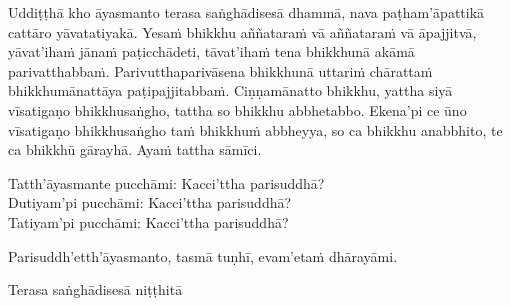 \medskip

\begin{center}
	Uddiṭṭhā kho āyasmanto terasa saṅghādisesā dhammā, nava paṭham'āpattikā cattāro yāvatatiyakā. Yesaṁ bhikkhu aññataraṁ vā aññataraṁ vā āpajjitvā, yāvat'ihaṁ jānaṁ paṭicchādeti, tāvat'ihaṁ tena bhikkhunā akāmā parivatthabbaṁ. Parivutthaparivāsena bhikkhunā uttariṁ chārattaṁ bhikkhumānattāya paṭipajjitabbaṁ. Ciṇṇamānatto bhikkhu, yattha siyā vīsatigaṇo bhikkhusaṅgho, tattha so bhikkhu abbhetabbo. Ekena'pi ce ūno vīsatigaṇo bhikkhusaṅgho taṁ bhikkhuṁ abbheyya, so ca bhikkhu anabbhito, te ca bhikkhū gārayhā. Ayaṁ tattha sāmīci.

	\smallskip

	Tatth'āyasmante pucchāmi: Kacci'ttha parisuddhā?\\
	Dutiyam'pi pucchāmi: Kacci'ttha parisuddhā?\\
	Tatiyam'pi pucchāmi: Kacci'ttha parisuddhā?

	\smallskip

	Parisuddh'etth'āyasmanto, tasmā tuṇhī, evam'etaṁ dhārayāmi.
\end{center}

\begin{outro}
	Terasa saṅghādisesā niṭṭhitā\makeatletter\hyperlink{endnote11-appendix}\makeatother
\end{outro}

\clearpage

